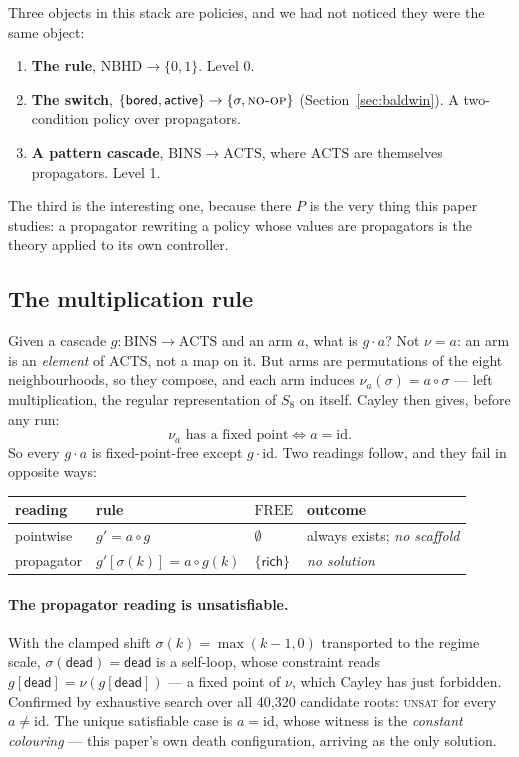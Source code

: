 \documentclass[man,12pt,floatsintext]{apa7}
\newcommand{\sig}{\sigma}
\begin{document}
Three objects in this stack are policies, and we had not noticed they were the
same object:
\begin{enumerate}
  \item \textbf{The rule}, $\mathrm{NBHD} \to \{0,1\}$. Level 0.
  \item \textbf{The switch}, $\{\textsf{bored}, \textsf{active}\} \to \{\sig,
        \textsc{no-op}\}$ (Section~\ref{sec:baldwin}). A two-condition policy over
        propagators.
  \item \textbf{A pattern cascade}, $\mathrm{BINS} \to \mathrm{ACTS}$, where
        $\mathrm{ACTS}$ are themselves propagators. Level 1.
\end{enumerate}
The third is the interesting one, because there $P$ is the very thing this paper
studies: a propagator rewriting a policy whose values are propagators is the
theory applied to its own controller.

\subsection{The multiplication rule}

Given a cascade $g : \mathrm{BINS} \to \mathrm{ACTS}$ and an arm $a$, what is
$g \cdot a$? Not $\nu = a$: an arm is an \emph{element} of $\mathrm{ACTS}$, not a
map on it. But arms are permutations of the eight neighbourhoods, so they compose,
and each arm induces $\nu_a(\sig) = a \circ \sig$ --- left multiplication, the
regular representation of $S_8$ on itself. Cayley then gives, before any run:
\[
  \nu_a \text{ has a fixed point} \iff a = \mathrm{id}.
\]
So every $g \cdot a$ is fixed-point-free except $g \cdot \mathrm{id}$. Two readings
follow, and they fail in opposite ways:
\begin{center}
\begin{tabular}{llll}
\toprule
reading & rule & $\mathrm{FREE}$ & outcome \\
\midrule
pointwise  & $g' = a \circ g$              & $\emptyset$ & always exists; \emph{no scaffold} \\
propagator & $g'[\sig(k)] = a \circ g(k)$  & $\{\textsf{rich}\}$ & \emph{no solution} \\
\bottomrule
\end{tabular}
\end{center}

\paragraph{The propagator reading is unsatisfiable.}
With the clamped shift $\sig(k) = \max(k-1,0)$ transported to the regime scale,
$\sig(\textsf{dead}) = \textsf{dead}$ is a self-loop, whose constraint reads
$g[\textsf{dead}] = \nu(g[\textsf{dead}])$ --- a fixed point of $\nu$, which Cayley
has just forbidden. Confirmed by exhaustive search over all 40{,}320 candidate
roots: \textsc{unsat} for every $a \neq \mathrm{id}$. The unique satisfiable case
is $a = \mathrm{id}$, whose witness is the \emph{constant colouring} --- this
paper's own death configuration, arriving as the only solution.
\end{document}
